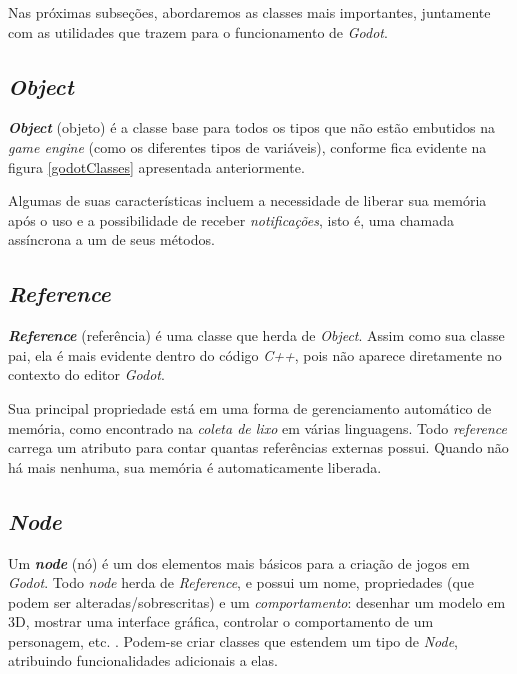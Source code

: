 Nas próximas subseções, abordaremos as classes mais importantes, juntamente com as utilidades que trazem para o funcionamento de \textit{Godot}.


\subsection{\textit{Object}}

\textbf{\textit{Object}} (objeto) é a classe base para todos os tipos que não estão embutidos na \textit{game engine} (como os diferentes tipos de variáveis), conforme fica evidente na figura \ref{godotClasses} apresentada anteriormente.

Algumas de suas características incluem a necessidade de liberar sua memória após o uso e a possibilidade de receber \emph{notificações}, isto é, uma chamada assíncrona a um de seus métodos.


\subsection{\textit{Reference}}

\textbf{\textit{Reference}} (referência) é uma classe que herda de \textit{Object}. Assim como sua classe pai, ela é mais evidente dentro do código \textit{C++}, pois não aparece diretamente no contexto do editor \textit{Godot}.

Sua principal propriedade está em uma forma de gerenciamento automático de memória, como encontrado na \textit{coleta de lixo} em várias linguagens. Todo \textit{reference} carrega um atributo para contar quantas referências externas possui. Quando não há mais nenhuma, sua memória é automaticamente liberada.


\subsection{\textit{Node}}
\label{godotNode}

Um \textbf{\textit{node}} (nó) é um dos elementos mais básicos para a criação de jogos em \textit{Godot}. Todo \textit{node} herda de \textit{Reference}, e possui um nome, propriedades (que podem ser alteradas/sobrescritas) e um \emph{comportamento}: desenhar um modelo em 3D, mostrar uma interface gráfica, controlar o comportamento de um personagem, etc. \citep{godotNode}. Podem-se criar classes que estendem um tipo de \textit{Node}, atribuindo funcionalidades adicionais a elas.

